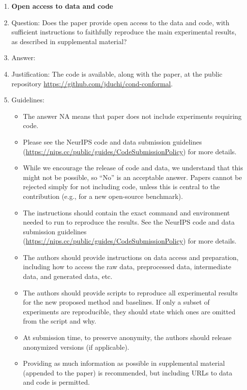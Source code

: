 \documentclass{article}
\begin{document}
\begin{enumerate}
\item {\bf Open access to data and code}
    \item[] Question: Does the paper provide open access to the data and code, with sufficient instructions to faithfully reproduce the main experimental results, as described in supplemental material?
    \item[] Answer: \answerYes{} %
    \item[] Justification: The code is available, along with the
      paper, at the public repository
      \url{https://github.com/jduchi/cond-conformal}.
    \item[] Guidelines:
    \begin{itemize}
        \item The answer NA means that paper does not include experiments requiring code.
        \item Please see the NeurIPS code and data submission guidelines (\url{https://nips.cc/public/guides/CodeSubmissionPolicy}) for more details.
        \item While we encourage the release of code and data, we understand that this might not be possible, so “No” is an acceptable answer. Papers cannot be rejected simply for not including code, unless this is central to the contribution (e.g., for a new open-source benchmark).
        \item The instructions should contain the exact command and environment needed to run to reproduce the results. See the NeurIPS code and data submission guidelines (\url{https://nips.cc/public/guides/CodeSubmissionPolicy}) for more details.
        \item The authors should provide instructions on data access and preparation, including how to access the raw data, preprocessed data, intermediate data, and generated data, etc.
        \item The authors should provide scripts to reproduce all experimental results for the new proposed method and baselines. If only a subset of experiments are reproducible, they should state which ones are omitted from the script and why.
        \item At submission time, to preserve anonymity, the authors should release anonymized versions (if applicable).
        \item Providing as much information as possible in supplemental material (appended to the paper) is recommended, but including URLs to data and code is permitted.
    \end{itemize}



\end{enumerate}
\end{document}
